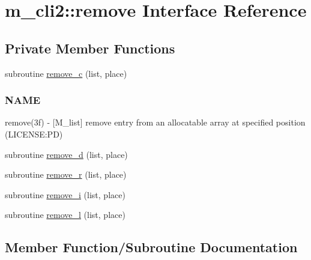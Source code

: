 \hypertarget{interfacem__cli2_1_1remove}{}\section{m\+\_\+cli2\+:\+:remove Interface Reference}
\label{interfacem__cli2_1_1remove}
\subsection*{Private Member Functions}
\begin{DoxyCompactItemize}
\item 
subroutine \mbox{\hyperlink{interfacem__cli2_1_1remove_aae13960af6c9ed2af46fdfec8e66a8a2}{remove\+\_\+c}} (list, place)
\begin{DoxyCompactList}\small\item\em \subsubsection*{N\+A\+ME}

remove(3f) -\/ \mbox{[}M\+\_\+list\mbox{]} remove entry from an allocatable array at specified position (L\+I\+C\+E\+N\+SE\+:PD) \end{DoxyCompactList}\item 
subroutine \mbox{\hyperlink{interfacem__cli2_1_1remove_a0d123599053c144f5ab233b735a38f1d}{remove\+\_\+d}} (list, place)
\item 
subroutine \mbox{\hyperlink{interfacem__cli2_1_1remove_a13995f1150dcabb9127cfeb30a629406}{remove\+\_\+r}} (list, place)
\item 
subroutine \mbox{\hyperlink{interfacem__cli2_1_1remove_a4a30f737b41e6cfca58ef2842d633b27}{remove\+\_\+i}} (list, place)
\item 
subroutine \mbox{\hyperlink{interfacem__cli2_1_1remove_a72934a0b165dc3d178ff7cbe6117a5b3}{remove\+\_\+l}} (list, place)
\end{DoxyCompactItemize}


\subsection{Member Function/\+Subroutine Documentation}
\mbox{\label{interfacem__cli2_1_1remove_aae13960af6c9ed2af46fdfec8e66a8a2}} 
